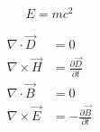 \documentclass[10pt,letterpaper]{article}
\begin{document}
	\begin{equation}
		E = m c^2
	\end{equation}
	
	\begin{align}
		\nabla \cdot \vec{D} &= 0 \\
		\nabla \times \vec{H} &= \frac{\partial \vec{D}}{\partial t} \\
		\nabla \cdot \vec{B} &= 0 \\
		\nabla \times \vec{E} &= -\frac{\partial \vec{B}}{\partial t}		
	\end{align}
\end{document}

